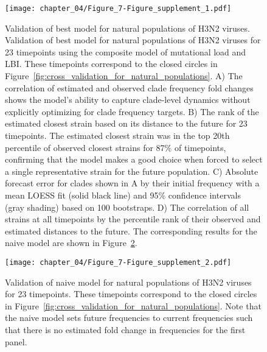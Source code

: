 \begin{figure}
  \texttt{[image: chapter\_04/Figure\_7-Figure\_supplement\_1.pdf]}
  \caption{
    Validation of best model for natural populations of H3N2 viruses.
    Validation of best model for natural populations of H3N2 viruses for 23 timepoints using the composite model of mutational load and LBI.
    These timepoints correspond to the closed circles in Figure~\ref{fig:cross_validation_for_natural_populations}.
    A) The correlation of estimated and observed clade frequency fold changes shows the model's ability to capture clade-level dynamics without explicitly optimizing for clade frequency targets.
    B) The rank of the estimated closest strain based on its distance to the future for 23 timepoints.
    The estimated closest strain was in the top 20th percentile of observed closest strains for 87\% of timepoints, confirming that the model makes a good choice when forced to select a single representative strain for the future population.
    C) Absolute forecast error for clades shown in A by their initial frequency with a mean LOESS fit (solid black line) and 95\% confidence intervals (gray shading) based on 100 bootstraps.
    D) The correlation of all strains at all timepoints by the percentile rank of their observed and estimated distances to the future.
    The corresponding results for the naive model are shown in Figure~\ref{fig:validation_of_naive_model_for_natural_populations}.
  }
  \label{fig:validation_of_best_model_for_natural_populations}
\end{figure}

\begin{figure}
  \texttt{[image: chapter\_04/Figure\_7-Figure\_supplement\_2.pdf]}
  \caption{
    Validation of naive model for natural populations of H3N2 viruses for 23 timepoints.
    These timepoints correspond to the closed circles in Figure~\ref{fig:cross_validation_for_natural_populations}.
    Note that the naive model sets future frequencies to current frequencies such that there is no estimated fold change in frequencies for the first panel.
  }
  \label{fig:validation_of_naive_model_for_natural_populations}
\end{figure}

